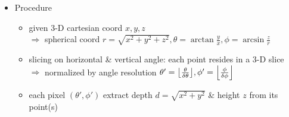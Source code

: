 \begin{itemize}
\begin{itemize}
	\item Procedure
		\begin{itemize}
		\item given $3$-D cartesian coord $x,y,z$ \\ 
		$\Rightarrow$ spherical coord $r = \sqrt{x^2+y^2+z^2}, \theta = \arctan{\frac y x}, \phi=\arcsin{\frac {z} {r}}$
		\item slicing on horizontal \& vertical angle: each point resides in a $3$-D slice \\ 
		$\Rightarrow$ normalized by angle resolution $\theta' = \floor*{\frac \theta {\delta \theta}}, \phi' = \floor*{\frac \phi {\delta \phi}}$
		\item each pixel $(\theta', \phi')$ extract depth $d=\sqrt{x^2+y^2}$ \& height $z$ from its point(s)
		\end{itemize}
	\end{itemize}
\end{itemize}

